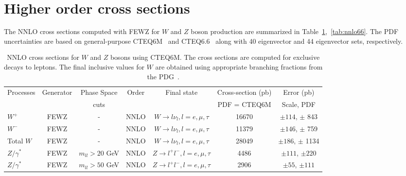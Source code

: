 \section{Higher order cross sections}
\label{sec:results}
The NNLO cross sections computed with FEWZ for $W$ and $Z$ boson production 
are summarized in 
Table~\ref{tab:nnlo},~\ref{tab:nnlo66}. The PDF uncertainties are based on general-purpose 
CTEQ6M~\cite{cteq6m} and CTEQ6.6~\cite{cteq66} along with 40 eigenvector and 44 eigenvector sets, respectively.

\vspace{3mm}
\begin{table}[hbt]
\begin{center}
\renewcommand{\arraystretch}{1.2}
\begin{tabular}{|l|c|c|c|c|c|c|}\hline
Processes & Generator & Phase Space& Order & Final state & Cross-section (pb)& Error (pb) \\ 
 &  &  cuts & & & PDF = CTEQ6M & Scale, PDF \\ \hline
$W^+$ & FEWZ & - & NNLO & $W \rightarrow l \nu_l, l=e,\mu,\tau$ & 16670 & $\pm 114$, $\pm$ 843 \\ \hline
$W^-$ & FEWZ & - & NNLO & $W \rightarrow l \nu_l, l=e,\mu,\tau$ & 11379 & $\pm 146$, $\pm$ 759 \\ \hline
Total $W$ & FEWZ & - & NNLO & $W \rightarrow l \nu_l, l=e,\mu,\tau$ & 28049 & $\pm 186$, $\pm$ 1134 \\ \hline
$Z/\gamma^*$ & FEWZ & $m_{ll} > 20$ GeV & NNLO & $Z \rightarrow l^+l^-, l=e,\mu,\tau$ & 4486 & $\pm 111$, $\pm 220$ \\ \hline
$Z/\gamma^*$ & FEWZ & $m_{ll} > 50$ GeV & NNLO & $Z \rightarrow l^+l^-, l=e,\mu,\tau$ & 2906 & $\pm 55$, $\pm 111$ \\ \hline
\end{tabular} 
\caption{NNLO cross sections for $W$ and $Z$ bosons using CTEQ6M. The cross sections are computed for
exclusive decays to leptons. The final inclusive values for $W$ are obtained using appropriate 
branching fractions from the PDG~\cite{pdg}. \label{tab:nnlo}}
\end{center}
\end{table}


